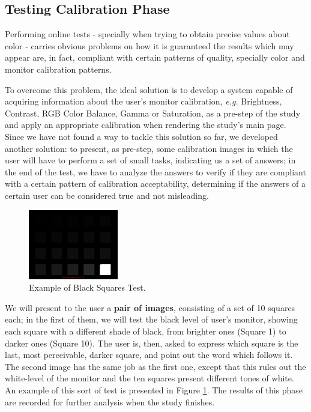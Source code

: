 \subsection{Testing Calibration Phase}
\label{subsec:design_calibration}
%
Performing online tests - specially when trying to obtain precise values about color - carries obvious problems on how it is guaranteed the results which may appear are, in fact, compliant with certain patterns of
quality, specially color and monitor calibration patterns. \par
%
To overcome this problem, the ideal solution is to develop a system capable of acquiring information about the user's monitor calibration, \emph{e.g.} Brightness, Contrast, RGB Color Balance, Gamma or Saturation, as a pre-step of the study and apply an appropriate calibration when rendering the study's main page. Since we have not found a way to tackle this solution so far, we developed another solution: to present, as pre-step, some calibration images in which the user will have to perform a set of small tasks, indicating us a set of answers; in the end of the test, we have to analyze the answers to verify if they are compliant with a certain pattern of calibration acceptability, determining if the answers of a certain user can be considered true and not misleading. \par
%
\begin{figure}[!ht]
	\centering
  \includegraphics[width=0.35\textwidth]{images/blacktest_example.png}
  \caption[Black Squares Test]{Example of Black Squares Test.\protect\footnotemark{}}
  \label{fig:blacktest_example}
\end{figure}
%
We will present to the user a \textbf{pair of images}, consisting of a set of 10 squares each; in the first of them, we will test the black level of user's monitor, showing each square with a different shade of black, from brighter ones (Square 1) to darker ones (Square 10). The user is, then, asked to express which square is the last, most perceivable, darker square, and point out the word which follows it. The second image has the same job as the first one, except that this rules out the white-level of the monitor and the ten squares present different tones of white. An example of this sort of test is presented in Figure \ref{fig:blacktest_example}. The results of this phase are recorded for further analysis when the study finishes. \par
